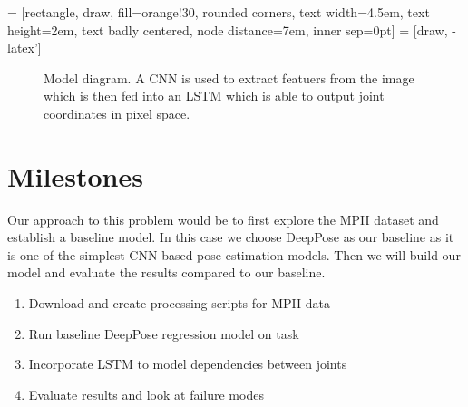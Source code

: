 \documentclass[12pt]{article}
\begin{document}
 = [rectangle, draw, fill=orange!30, rounded corners, text width=4.5em, text height=2em, text badly centered, node distance=7em, inner sep=0pt]
 = [draw, -latex']


\begin{figure}
\label{model_diag}
\caption{Model diagram. A CNN is used to extract featuers from the image which is then fed into an LSTM which is able to output joint coordinates in pixel space.}
\end{figure}

\section{Milestones}

Our approach to this problem would be to first explore the MPII dataset and establish a baseline model. In this case we choose DeepPose as our baseline as it is one of the simplest CNN based pose estimation models. Then we will build our model and evaluate the results compared to our baseline.

\begin{enumerate}
\item Download and create processing scripts for MPII data
\item Run baseline DeepPose regression model on task
\item Incorporate LSTM to model dependencies between joints
\item Evaluate results and look at failure modes
\end{enumerate}

\nocite{*}


\end{document}
